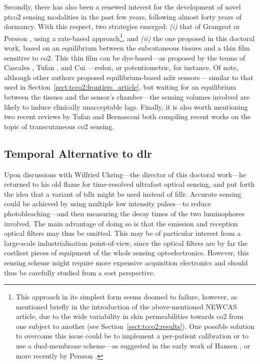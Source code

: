 Secondly, there has also been a renewed interest for the development of novel \gls{ptco2} sensing modalities in the past few years, following almost forty years of dormancy. With this respect, two strategies emerged: \textit{(i)} that of Grangeat \etal{}\cite{grangeat2023} or Persson \etal{}\cite{persson2023}, using a rate-based approach\footnote{This approach in its simplest form seems doomed to failure, however, as mentioned briefly in the introduction of the above-mentioned NEWCAS article\cite{dervieux2024newcas}, due to the wide variability in skin permeabilities towards \gls{co2} from one subject to another (see Section~\ref{sect:tcco2:results}). One possible solution to overcome this issue could be to implement a per-patient calibration or to use a dual-membrane scheme---as suggested in the early work of Hansen \etal{}\cite{hansen1980}, or more recently by Persson \etal{}\cite{persson2023}.}, and \textit{(ii)} the one proposed in this doctoral work, based on an equilibrium between the subcutaneous tissues and a thin film sensitive to \gls{co2}. This thin film can be dye-based---as proposed by the teams of Cascales \etal{}\cite{cascales2022, cascales2023}, Tufan \etal{}\cite{tufan2022, tufan2023a, tufan2023c}, and Cui \etal{}\cite{cui2024}---redox\cite{ahuja2023}, or potentiometric\cite{jia2024}, for instance. Of note, although other authors proposed equilibrium-based \gls{ndir} sensors---\ie{} similar to that used in Section~\ref{sect:tcco2:frontiers_article}, but waiting for an equilibrium between the tissues and the sensor's chamber---the sensing volumes involved are likely to induce clinically unacceptable lags\cite{li2023non, angelucci2024, elsafoury2024}. Finally, it is also worth mentioning two recent reviews by Tufan \etal{}\cite{tufan2023b} and Bernasconi \etal{}\cite{bernasconi2024} both compiling recent works on the topic of transcutaneous \gls{co2} sensing.

\subsection{Temporal Alternative to \texorpdfstring{\gls{dlr}}{DLR}}

Upon discussions with Wilfried Uhring---the director of this doctoral work---he returned to his old flame for time-resolved ultrafast optical sensing, and put forth the idea that a variant of \gls{tdlr} might be used instead of \gls{fdlr}. Accurate sensing could be achieved by using multiple low intensity pulses---to reduce photobleaching---and then measuring the decay times of the two luminophores involved. The main advantage of doing so is that the emission and reception optical filters may thus be omitted. This may be of particular interest from a large-scale industrialisation point-of-view, since the optical filters are by far the costliest pieces of equipment of the whole sensing optoelectronics. However, this sensing scheme might require more expensive acquisition electronics and should thus be carefully studied from a cost perspective.

